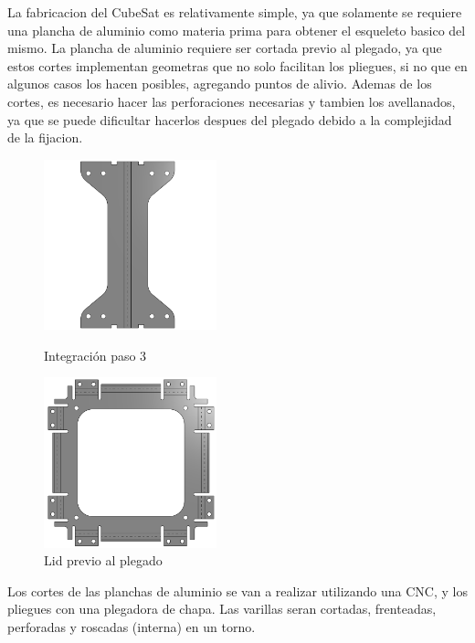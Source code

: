       La fabricacion del CubeSat es relativamente simple, ya que solamente se requiere una
      plancha de aluminio como materia prima para obtener el esqueleto basico del mismo. La
      plancha de aluminio requiere ser cortada previo al plegado, ya que estos cortes implementan
      geometras que no solo facilitan los pliegues, si no que en algunos casos los hacen posibles,
      agregando puntos de alivio. Ademas de los cortes, es necesario hacer las perforaciones necesarias
      y tambien los avellanados, ya que se puede dificultar hacerlos despues del plegado
      debido a la complejidad de la fijacion.
      \begin{figure}[H]
        \begin{minipage}{0.5\textwidth}
          \centering
          \includegraphics[width=50mm]{image/structure/cornerFlat.png}
          \caption{Integración paso 3}
          \label{fig:corner previo al plegado}
        \end{minipage}
        \begin{minipage}{0.5\textwidth}
          \centering
          \includegraphics[width=50mm]{image/structure/lidFlat.png}
          \caption{Lid previo al plegado}
          \label{fig:lidfp}
        \end{minipage}
      \end{figure}
      Los cortes de las planchas de aluminio se van a realizar utilizando una CNC, y los pliegues
      con una plegadora de chapa.
      Las varillas seran cortadas, frenteadas, perforadas y roscadas (interna) en un torno.

